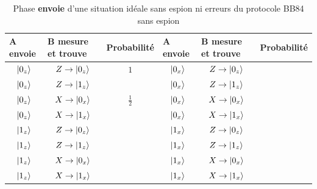 \begin{table}[ptbh]
\centering
{\footnotesize {
\begin{tabular}
[c]{|l|l|l||l|l|l|}\hline
\rowcolor[gray]{0.8}\textbf{A envoie} & \textbf{B mesure et trouve} &
\textbf{Probabilité} & \textbf{A envoie} & \textbf{B mesure et trouve} &
\textbf{Probabilité}\\\hline
\multicolumn{1}{|c|}{$\vert0_{z}\rangle$} &
\multicolumn{1}{|c|}{$Z\rightarrow\vert0_{z}\rangle$} &
\multicolumn{1}{|c||}{$1$} & \multicolumn{1}{||c|}{$\vert0_{x}\rangle$} &
\multicolumn{1}{|c|}{$Z\rightarrow\vert0_{z}\rangle$} &
\multicolumn{1}{|c|}{}\\\hline
\multicolumn{1}{|c|}{$\vert0_{z}\rangle$} &
\multicolumn{1}{|c|}{$Z\rightarrow\vert1_{z}\rangle$} &
\multicolumn{1}{|c||}{} & \multicolumn{1}{||c|}{$\vert0_{x}\rangle
$} & \multicolumn{1}{|c|}{$Z\rightarrow\vert1_{z}\rangle$} &
\multicolumn{1}{|c|}{}\\\hline
\multicolumn{1}{|c|}{$\vert0_{z}\rangle$} &
\multicolumn{1}{|c|}{$X\rightarrow\vert0_{x}\rangle$} &
\multicolumn{1}{|c||}{$\frac{1}{2}$} & \multicolumn{1}{||c|}{$\vert0_{x}\rangle$} &
\multicolumn{1}{|c|}{$X\rightarrow\vert0_{x}\rangle$} & \multicolumn{1}{|c|}{}\\\hline
\multicolumn{1}{|c|}{$\vert0_{z}\rangle$} &
\multicolumn{1}{|c|}{$X\rightarrow\vert1_{x}\rangle$} &
\multicolumn{1}{|c||}{} & \multicolumn{1}{||c|}{$\vert0_{x}\rangle
$} & \multicolumn{1}{|c|}{$X\rightarrow\vert1_{x}\rangle$} &
\multicolumn{1}{|c|}{}\\\hline\hline
\multicolumn{1}{|c|}{$\vert1_{z}\rangle$} &
\multicolumn{1}{|c|}{$Z\rightarrow\vert0_{z}\rangle$} &
\multicolumn{1}{|c||}{} & \multicolumn{1}{||c|}{$\vert1_{x}\rangle
$} & \multicolumn{1}{|c|}{$Z\rightarrow\vert0_{z}\rangle$} &
\multicolumn{1}{|c|}{}\\\hline
\multicolumn{1}{|c|}{$\vert1_{z}\rangle$} &
\multicolumn{1}{|c|}{$Z\rightarrow\vert1_{z}\rangle$} &
\multicolumn{1}{|c||}{} & \multicolumn{1}{||c|}{$\vert1_{x}\rangle
$} & \multicolumn{1}{|c|}{$Z\rightarrow\vert1_{z}\rangle$} &
\multicolumn{1}{|c|}{}\\\hline
\multicolumn{1}{|c|}{$\vert1_{z}\rangle$} &
\multicolumn{1}{|c|}{$X\rightarrow\vert0_{x}\rangle$} &
\multicolumn{1}{|c||}{} & \multicolumn{1}{||c|}{$\vert1_{x}\rangle
$} & \multicolumn{1}{|c|}{$X\rightarrow\vert0_{x}\rangle$} &
\multicolumn{1}{|c|}{}\\\hline
\multicolumn{1}{|c|}{$\vert1_{z}\rangle$} &
\multicolumn{1}{|c|}{$X\rightarrow\vert1_{x}\rangle$} &
\multicolumn{1}{|c||}{} & \multicolumn{1}{||c|}{$\vert1_{x}\rangle
$} & \multicolumn{1}{|c|}{$X\rightarrow\vert1_{x}\rangle$} &
\multicolumn{1}{|c|}{}\\\hline
\end{tabular}
}}\caption{Phase \textbf{envoie} d'une situation idéale sans espion ni erreurs
du protocole BB84 sans espion}%
\label{tab:BB4SSEspion}%
\end{table}

